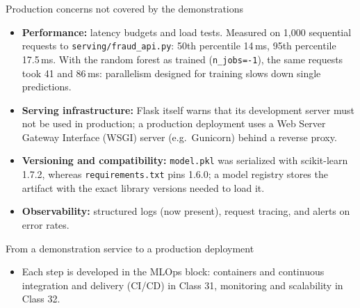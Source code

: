 \begin{frame}{Production concerns not covered by the demonstrations}
\begin{itemize}\small
\item \textbf{Performance:} latency budgets and load tests. Measured on 1{,}000 sequential requests to \texttt{serving/fraud\_api.py}: 50th percentile 14\,ms, 95th percentile 17.5\,ms. With the random forest as trained (\texttt{n\_jobs=-1}), the same requests took 41 and 86\,ms: parallelism designed for training slows down single predictions.
\item \textbf{Serving infrastructure:} Flask itself warns that its development server must not be used in production; a production deployment uses a Web Server Gateway Interface (WSGI) server (e.g.\ Gunicorn) behind a reverse proxy.
\item \textbf{Versioning and compatibility:} \texttt{model.pkl} was serialized with scikit-learn 1.7.2, whereas \texttt{requirements.txt} pins 1.6.0; a model registry stores the artifact with the exact library versions needed to load it.
\item \textbf{Observability:} structured logs (now present), request tracing, and alerts on error rates.
\end{itemize}
\coursefooter
\end{frame}

\begin{frame}{From a demonstration service to a production deployment}
\centering
{}
\vspace{0.6em}
\begin{itemize}
\item Each step is developed in the MLOps block: containers and continuous integration and delivery (CI/CD) in Class 31, monitoring and scalability in Class 32.
\end{itemize}
\coursefooter
\end{frame}

